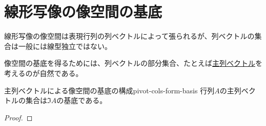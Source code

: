 \documentclass[../../../topic_linear-algebra]{subfiles}
\begin{document}
\sectionline
\section{線形写像の像空間の基底}

線形写像の像空間は表現行列の列ベクトルによって張られるが、列ベクトルの集合は一般には線型独立ではない。

像空間の基底を得るためには、列ベクトルの部分集合、たとえば\hyperref[def:pivot-columns]{主列ベクトル}を考えるのが自然である。

\begin{theorem}{主列ベクトルによる像空間の基底の構成}{pivot-cols-form-basis}
  行列$A$の主列ベクトルの集合は$\Im A$の基底である。
\end{theorem}

\begin{proof}
\end{proof}
\end{document}
